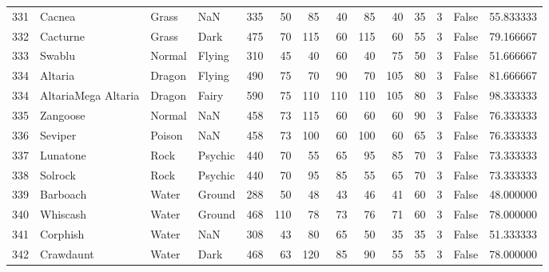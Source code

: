 \begin{tabular}{rlllrrrrrrrrlr}
 331 &                     Cacnea &     Grass &       NaN &    335 &   50 &      85 &       40 &       85 &       40 &     35 &           3 &      False &   55.833333 \\
 332 &                   Cacturne &     Grass &      Dark &    475 &   70 &     115 &       60 &      115 &       60 &     55 &           3 &      False &   79.166667 \\
 333 &                     Swablu &    Normal &    Flying &    310 &   45 &      40 &       60 &       40 &       75 &     50 &           3 &      False &   51.666667 \\
 334 &                    Altaria &    Dragon &    Flying &    490 &   75 &      70 &       90 &       70 &      105 &     80 &           3 &      False &   81.666667 \\
 334 &        AltariaMega Altaria &    Dragon &     Fairy &    590 &   75 &     110 &      110 &      110 &      105 &     80 &           3 &      False &   98.333333 \\
 335 &                   Zangoose &    Normal &       NaN &    458 &   73 &     115 &       60 &       60 &       60 &     90 &           3 &      False &   76.333333 \\
 336 &                    Seviper &    Poison &       NaN &    458 &   73 &     100 &       60 &      100 &       60 &     65 &           3 &      False &   76.333333 \\
 337 &                   Lunatone &      Rock &   Psychic &    440 &   70 &      55 &       65 &       95 &       85 &     70 &           3 &      False &   73.333333 \\
 338 &                    Solrock &      Rock &   Psychic &    440 &   70 &      95 &       85 &       55 &       65 &     70 &           3 &      False &   73.333333 \\
 339 &                   Barboach &     Water &    Ground &    288 &   50 &      48 &       43 &       46 &       41 &     60 &           3 &      False &   48.000000 \\
 340 &                   Whiscash &     Water &    Ground &    468 &  110 &      78 &       73 &       76 &       71 &     60 &           3 &      False &   78.000000 \\
 341 &                   Corphish &     Water &       NaN &    308 &   43 &      80 &       65 &       50 &       35 &     35 &           3 &      False &   51.333333 \\
 342 &                  Crawdaunt &     Water &      Dark &    468 &   63 &     120 &       85 &       90 &       55 &     55 &           3 &      False &   78.000000 \\

\end{tabular}
